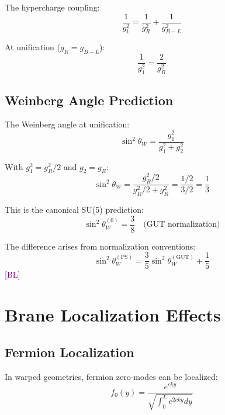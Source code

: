 \documentclass[11pt,a4paper]{article}
\newcommand{\tagBL}{\textcolor{purple}{[BL]}}
\begin{document}
The hypercharge coupling:
\begin{equation}
\label{eq:g1-from-ps}
\frac{1}{g_1^2} = \frac{1}{g_R^2} + \frac{1}{g_{B-L}^2}
\end{equation}

At unification ($g_R = g_{B-L}$):
\begin{equation}
\label{eq:g1-unified}
\frac{1}{g_1^2} = \frac{2}{g_R^2}
\end{equation}

\subsection{Weinberg Angle Prediction}

The Weinberg angle at unification:
\begin{equation}
\label{eq:sin2-def}
\sin^2\theta_W = \frac{g_1^2}{g_1^2 + g_2^2}
\end{equation}

With $g_1^2 = g_R^2/2$ and $g_2 = g_R$:
\begin{equation}
\label{eq:sin2-calc}
\sin^2\theta_W = \frac{g_R^2/2}{g_R^2/2 + g_R^2} = \frac{1/2}{3/2} = \frac{1}{3}
\end{equation}

This is the canonical SU(5) prediction:
\begin{equation}
\label{eq:sin2-canonical}
\sin^2\theta_W^{(0)} = \frac{3}{8} \quad \text{(GUT normalization)}
\end{equation}

The difference arises from normalization conventions:
\begin{equation}
\label{eq:sin2-relation}
\sin^2\theta_W^{(\text{PS})} = \frac{3}{5} \sin^2\theta_W^{(\text{GUT})} + \frac{1}{5}
\end{equation}
\tagBL

\section{Brane Localization Effects}
\label{app:brane}

\subsection{Fermion Localization}

In warped geometries, fermion zero-modes can be localized:
\begin{equation}
\label{eq:localization}
f_0(y) = \frac{e^{c k y}}{\sqrt{\int_0^L e^{2ck y} dy}}
\end{equation}
\end{document}
